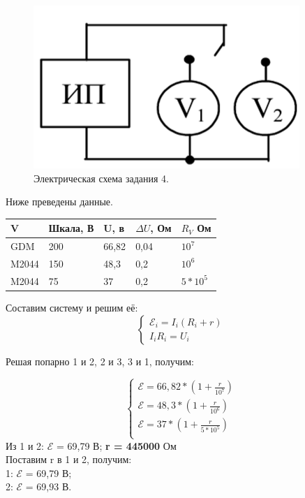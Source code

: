 \documentclass[a4paper,12pt]{article}
\begin{document}
\begin{figure}[h!]
	\begin{center}
		\includegraphics[scale=0.8]{scheme_4.png}
	\end{center}
	\caption{Электрическая схема задания 4.}
\end{figure}

Ниже преведены данные.
\begin{table}[!ht]
    \centering
    \begin{tabular}{|l|l|l|l|l|}
    \hline
        V & Шкала, В & U, в & $\Delta U$, Ом  & $R_V$ Ом \\ \hline
        GDM & 200 & 66,82 & 0,04 & $10^7$ \\ \hline
        M2044 & 150 & 48,3 & 0,2 & $10^6$ \\ \hline
        M2044 & 75 & 37 & 0,2 & $5*10^5$ \\ \hline
    \end{tabular}
\end{table}

Составим систему и решим её:
\begin{equation}
    \begin{cases}
    \mathcal{E}_i = I_i(R_i + r)\\
    I_iR_i=U_i
    \end{cases}
\end{equation}

Решая попарно 1 и 2, 2 и 3, 3 и 1, получим:

\begin{equation}
    \begin{cases}
    \mathcal{E} = 66,82 * (1+\frac{r}{10^7})\\
    \mathcal{E} = 48,3 * (1+\frac{r}{10^6})\\
    \mathcal{E} = 37 * (1+\frac{r}{5*10^5})\\
    \end{cases}
\end{equation}
Из 1 и 2: $\mathcal{E}$ = 69,79 В;\textbf{ r = 445000 }Ом\\
Поставим r в 1 и 2, получим: \\1: $\mathcal{E}$ = 69,79 В;\\ 2: $\mathcal{E}$ = 69,93 В. 
\end{document}
